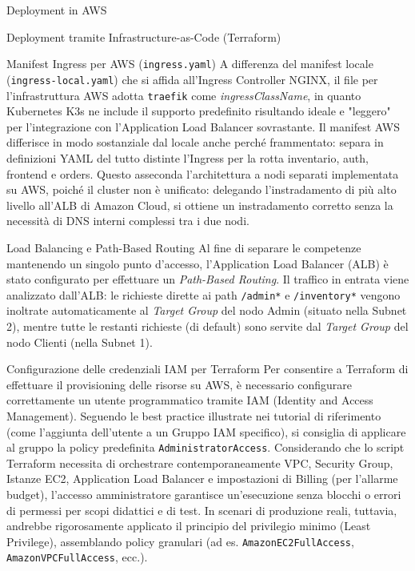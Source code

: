\begin{mychapter}{Deployment in AWS}
\begin{mysection}{Deployment tramite Infrastructure-as-Code (Terraform)}
\begin{mysubsection}{Manifest Ingress per AWS (\texttt{ingress.yaml})}
A differenza del manifest locale (\texttt{ingress-local.yaml}) che si affida all'Ingress Controller NGINX, il file per l'infrastruttura AWS adotta \texttt{traefik} come \textit{ingressClassName}, in quanto Kubernetes K3s ne include il supporto predefinito risultando ideale e "leggero" per l'integrazione con l'Application Load Balancer sovrastante. Il manifest AWS differisce in modo sostanziale dal locale anche perché frammentato: separa in definizioni YAML del tutto distinte l'Ingress per la rotta inventario, auth, frontend e orders. Questo asseconda l'architettura a nodi separati implementata su AWS, poiché il cluster non è unificato: delegando l'instradamento di più alto livello all'ALB di Amazon Cloud, si ottiene un instradamento corretto senza la necessità di DNS interni complessi tra i due nodi.
\end{mysubsection}

\begin{mysubsection}{Load Balancing e Path-Based Routing}
Al fine di separare le competenze mantenendo un singolo punto d'accesso, l'Application Load Balancer (ALB) è stato configurato per effettuare un \textit{Path-Based Routing}. Il traffico in entrata viene analizzato dall'ALB: le richieste dirette ai path \texttt{/admin*} e \texttt{/inventory*} vengono inoltrate automaticamente al \textit{Target Group} del nodo Admin (situato nella Subnet 2), mentre tutte le restanti richieste (di default) sono servite dal \textit{Target Group} del nodo Clienti (nella Subnet 1).
\end{mysubsection}

\begin{mysubsection}{Configurazione delle credenziali IAM per Terraform}
Per consentire a Terraform di effettuare il provisioning delle risorse su AWS, è necessario configurare correttamente un utente programmatico tramite IAM (Identity and Access Management). Seguendo le best practice illustrate nei tutorial di riferimento (come l'aggiunta dell'utente a un Gruppo IAM specifico), si consiglia di applicare al gruppo la policy predefinita \texttt{AdministratorAccess}. 
Considerando che lo script Terraform necessita di orchestrare contemporaneamente VPC, Security Group, Istanze EC2, Application Load Balancer e impostazioni di Billing (per l'allarme budget), l'accesso amministratore garantisce un'esecuzione senza blocchi o errori di permessi per scopi didattici e di test. In scenari di produzione reali, tuttavia, andrebbe rigorosamente applicato il principio del privilegio minimo (Least Privilege), assemblando policy granulari (ad es. \texttt{AmazonEC2FullAccess}, \texttt{AmazonVPCFullAccess}, ecc.).
\end{mysubsection}


\end{mysection}
\end{mychapter}
